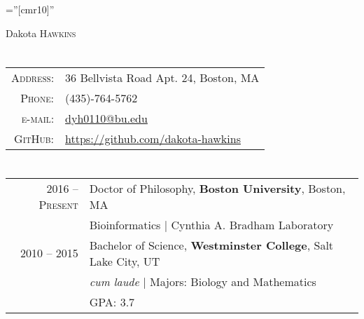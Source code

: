 \documentclass[a4paper,10pt]{article}
\begin{document}
\pagestyle{empty} %

\font\fb=''[cmr10]'' %

\par{\centering
		{\Huge Dakota \textsc{Hawkins}
	}\bigskip\par}

\section{\color{linkcolour}{Contact}}

\begin{tabular}{rl}
    \textsc{Address:} & 36 Bellvista Road Apt. 24, Boston, MA \\
    \textsc{Phone:}   & (435)-764-5762 \\
    \textsc{e-mail:}  & \href{mailto:dyh0110@bu.edu}{dyh0110@bu.edu} \\
    \textsc{GitHub:}  & \href{https://github.com/dakota-hawkins}{https://github.com/dakota-hawkins}
\end{tabular}

\section{\color{linkcolour}{Education}}
\begin{tabular}{rl}
\textsc{2016 -- Present} & Doctor of Philosophy, \textbf{Boston University}, Boston, MA \\
& Bioinformatics | Cynthia A. Bradham Laboratory \\

 \textsc{2010 -- 2015} & Bachelor of Science, \textbf{Westminster College}, Salt Lake City, UT\\
& \small\emph{cum laude} | Majors: Biology and Mathematics\\
&\normalsize \textsc{GPA}: 3.7
\end{tabular}

\end{document}
